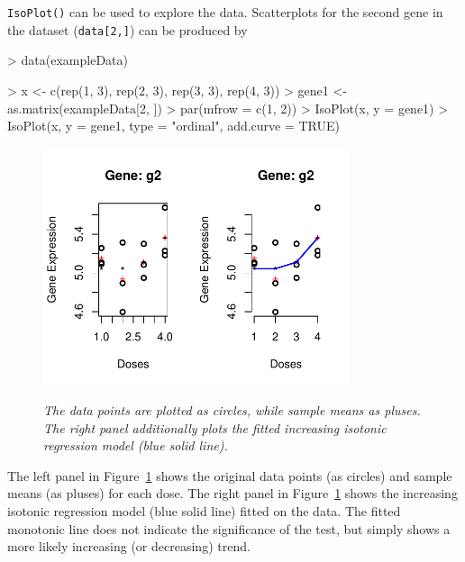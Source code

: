\documentclass[10pt]{article}
\begin{document}
\texttt{IsoPlot()} can be used to explore the data. Scatterplots for the
second gene in the dataset (\texttt{data[2,]}) can be produced by

\begin{Schunk}
\begin{Sinput}
> data(exampleData)
\end{Sinput}
\end{Schunk}


\begin{Schunk}
\begin{Sinput}
> x <- c(rep(1, 3), rep(2, 3), rep(3, 3), rep(4, 3))
> gene1 <- as.matrix(exampleData[2, ])
> par(mfrow = c(1, 2))
> IsoPlot(x, y = gene1)
> IsoPlot(x, y = gene1, type = "ordinal", add.curve = TRUE)
\end{Sinput}
\end{Schunk}
 
 
 

\begin{figure}[!h]
\centering
{\includegraphics[width=0.8\textwidth]{IsoGene-IsoPlot.pdf}}
\caption{\em{The data points are plotted as circles, while sample
means as pluses. The right panel additionally plots the fitted
increasing isotonic regression model (blue solid line).}}
\label{exgene}
\end{figure}




The left panel in Figure~\ref{exgene} shows the original data points
(as circles) and sample means (as pluses) for each dose. The right
panel in Figure~\ref{exgene} shows the increasing isotonic
regression model (blue solid line) fitted on the data. The fitted
monotonic line does not indicate the significance of the test, but
simply shows a more likely increasing (or decreasing) trend.
\end{document}
